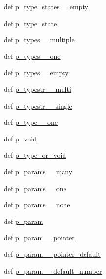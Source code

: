 \begin{DoxyCompactItemize}
\item 
def \hyperlink{classslicc_1_1parser_1_1SLICC_ad837bb9d3ebd0117fdc55a97533bb325}{p\_\-type\_\-states\_\-\_\-empty}
\item 
def \hyperlink{classslicc_1_1parser_1_1SLICC_a5d6073c10a02c57e4de563fed6c725ab}{p\_\-type\_\-state}
\item 
def \hyperlink{classslicc_1_1parser_1_1SLICC_a0589504fd03089550efdea0a4c8c705b}{p\_\-types\_\-\_\-multiple}
\item 
def \hyperlink{classslicc_1_1parser_1_1SLICC_a487617131fe6224cd4c4b0132f3c3ac9}{p\_\-types\_\-\_\-one}
\item 
def \hyperlink{classslicc_1_1parser_1_1SLICC_aa1ad43d69028fac967854e05a8512a59}{p\_\-types\_\-\_\-empty}
\item 
def \hyperlink{classslicc_1_1parser_1_1SLICC_a3bcdc6f6c174bab04271d90873cf8eaa}{p\_\-typestr\_\-\_\-multi}
\item 
def \hyperlink{classslicc_1_1parser_1_1SLICC_ac16b68e08eec93c439a56e9ba502a8ae}{p\_\-typestr\_\-\_\-single}
\item 
def \hyperlink{classslicc_1_1parser_1_1SLICC_a70796cbab50e66b568a4f47fbc1d9a7e}{p\_\-type\_\-\_\-one}
\item 
def \hyperlink{classslicc_1_1parser_1_1SLICC_a731b8aa21a36b5326ec2ebe9c8dba349}{p\_\-void}
\item 
def \hyperlink{classslicc_1_1parser_1_1SLICC_a48505420f44b16340027c70819004e74}{p\_\-type\_\-or\_\-void}
\item 
def \hyperlink{classslicc_1_1parser_1_1SLICC_ad817f3c7b9149f8b7b92dd07f3ce758a}{p\_\-params\_\-\_\-many}
\item 
def \hyperlink{classslicc_1_1parser_1_1SLICC_a4a9b0ea44fb9a558f4d63f9a688ecfd6}{p\_\-params\_\-\_\-one}
\item 
def \hyperlink{classslicc_1_1parser_1_1SLICC_ac0fdd46e2f1e3780cacfa11ef4facf02}{p\_\-params\_\-\_\-none}
\item 
def \hyperlink{classslicc_1_1parser_1_1SLICC_a44acb9129e75c48ab21ea601ece829d9}{p\_\-param}
\item 
def \hyperlink{classslicc_1_1parser_1_1SLICC_a2d8f55c927464513c7500638efab833c}{p\_\-param\_\-\_\-pointer}
\item 
def \hyperlink{classslicc_1_1parser_1_1SLICC_a35154ea522cbd0357d23d5ea0de7f9b0}{p\_\-param\_\-\_\-pointer\_\-default}
\item 
def \hyperlink{classslicc_1_1parser_1_1SLICC_ace79f284cc764b1bcd17d6b67fad8907}{p\_\-param\_\-\_\-default\_\-number}
\item 

\end{DoxyCompactItemize}
